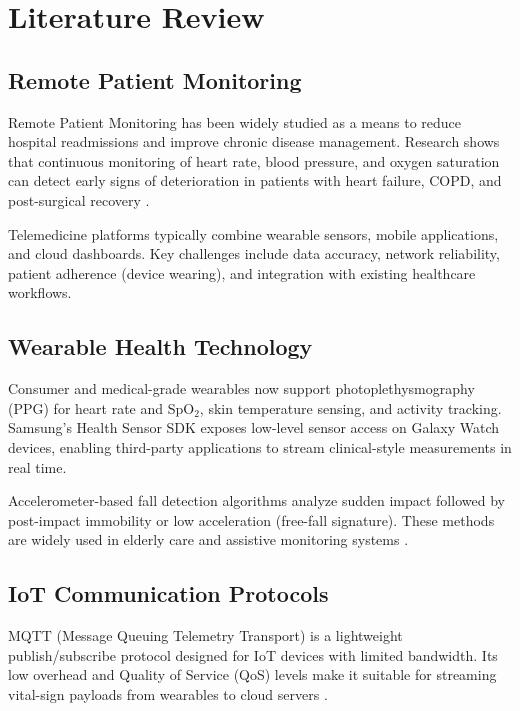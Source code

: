 \documentclass[12pt,a4paper]{report}
\begin{document}
\chapter{Literature Review}
\label{ch:litreview}

\section{Remote Patient Monitoring}

Remote Patient Monitoring has been widely studied as a means to reduce hospital readmissions and improve chronic disease management. Research shows that continuous monitoring of heart rate, blood pressure, and oxygen saturation can detect early signs of deterioration in patients with heart failure, COPD, and post-surgical recovery \cite{rpm_chronic}.

Telemedicine platforms typically combine wearable sensors, mobile applications, and cloud dashboards. Key challenges include data accuracy, network reliability, patient adherence (device wearing), and integration with existing healthcare workflows.

\section{Wearable Health Technology}

Consumer and medical-grade wearables now support photoplethysmography (PPG) for heart rate and SpO$_2$, skin temperature sensing, and activity tracking. Samsung's Health Sensor SDK exposes low-level sensor access on Galaxy Watch devices, enabling third-party applications to stream clinical-style measurements in real time.

Accelerometer-based fall detection algorithms analyze sudden impact followed by post-impact immobility or low acceleration (free-fall signature). These methods are widely used in elderly care and assistive monitoring systems \cite{fall_detection}.

\section{IoT Communication Protocols}

MQTT (Message Queuing Telemetry Transport) is a lightweight publish/subscribe protocol designed for IoT devices with limited bandwidth. Its low overhead and Quality of Service (QoS) levels make it suitable for streaming vital-sign payloads from wearables to cloud servers \cite{mqtt_iot}.
\end{document}
